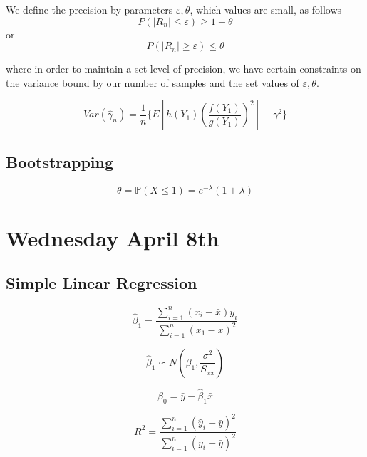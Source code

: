 \documentclass[11pt]{article}
\begin{document}
We define the precision by parameters $\varepsilon,\theta$, which values are small, as follows
\begin{equation}
    P(|R_n| \leq \varepsilon) \geq 1 - \theta
\end{equation}
or
\begin{equation}
    P(|R_n| \geq \varepsilon) \leq \theta
\end{equation}

where in order to maintain a set level of precision, we have certain constraints on the variance bound by our number of samples and the set values of $\varepsilon, \theta$.

\begin{equation}
    Var(\hat{\gamma}_n) = \frac{1}{n} \{ E[h(Y_1) (\frac{f(Y_1)}{g(Y_1)})^2 ] - \gamma^2 \}
\end{equation}

\subsection{Bootstrapping}
\begin{equation}
    \theta = \mathbb{P}(X \leq 1) = e^{-\lambda} (1 + \lambda)
\end{equation}

\section{Wednesday April 8th}
\subsection{Simple Linear Regression}
\begin{equation}
    \hat{\beta}_1 = \frac{\sum_{i=1}^{n}(x_i - \bar{x})y_i}{\sum_{i=1}^{n}(x_1 - \bar{x})^2}
\end{equation}

\begin{equation}
    \hat{\beta}_1 \backsim N(\beta_1, \frac{\sigma^2}{S_{xx}})
\end{equation}

\begin{equation}
    \hat{\beta}_0 = \bar{y} - \hat{\beta}_1 \bar{x}
\end{equation}

\begin{equation}
    R^2 = \frac{\sum_{i=1}^{n}(\hat{y}_i - \bar{y})^2}{\sum_{i=1}^{n}(y_i - \bar{y})^2}
\end{equation}
\end{document}
